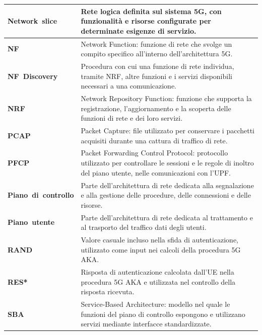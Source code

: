 \begin{longtable}{|>{\raggedright\arraybackslash}p{}|>{\raggedright\arraybackslash}p{}|}
\mbox{\textbf{Network slice}} & Rete logica definita sul sistema 5G, con funzionalità e risorse configurate per determinate esigenze di servizio. \\
\hline

\mbox{\textbf{NF}} & Network Function: funzione di rete che svolge un compito specifico all'interno dell'architettura 5G. \\
\hline

\mbox{\textbf{NF Discovery}} & Procedura con cui una funzione di rete individua, tramite NRF, altre funzioni e i servizi disponibili necessari a una comunicazione. \\
\hline

\mbox{\textbf{NRF}} & Network Repository Function: funzione che supporta la registrazione, l'aggiornamento e la scoperta delle funzioni di rete e dei loro servizi. \\
\hline

\mbox{\textbf{PCAP}} & Packet Capture: file utilizzato per conservare i pacchetti acquisiti durante una cattura di traffico di rete. \\
\hline

\mbox{\textbf{PFCP}} & Packet Forwarding Control Protocol: protocollo utilizzato per controllare le sessioni e le regole di inoltro del piano utente, nelle comunicazioni con l'UPF. \\
\hline

\mbox{\textbf{Piano di controllo}} & Parte dell'architettura di rete dedicata alla segnalazione e alla gestione delle procedure, delle connessioni e delle risorse. \\
\hline

\mbox{\textbf{Piano utente}} & Parte dell'architettura di rete dedicata al trattamento e al trasporto del traffico dati degli utenti. \\
\hline

\mbox{\textbf{RAND}} & Valore casuale incluso nella sfida di autenticazione, utilizzato come input nei calcoli della procedura 5G AKA. \\
\hline

\mbox{\textbf{RES*}} & Risposta di autenticazione calcolata dall'UE nella procedura 5G AKA e utilizzata nel controllo della risposta ricevuta. \\
\hline

\mbox{\textbf{SBA}} & Service-Based Architecture: modello nel quale le funzioni del piano di controllo espongono e utilizzano servizi mediante interfacce standardizzate. \\
\hline


\end{longtable}
